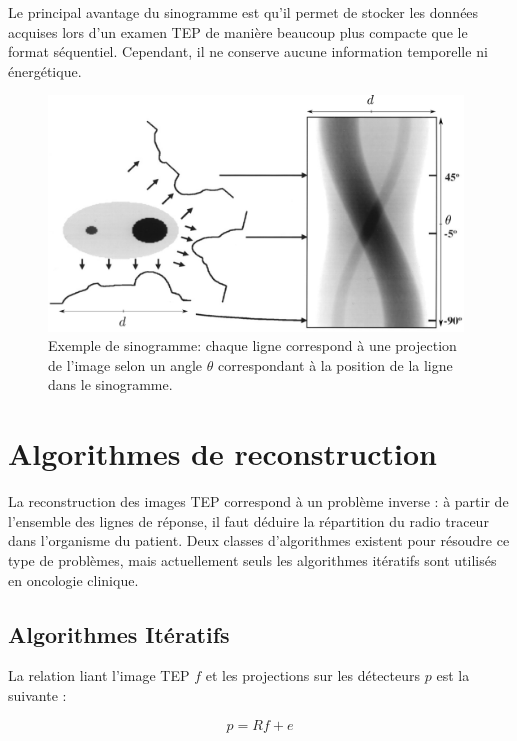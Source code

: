 Le principal avantage du sinogramme est qu'il permet de stocker les données acquises lors d'un examen TEP de manière beaucoup plus compacte que le format séquentiel. Cependant, il ne conserve aucune information temporelle ni énergétique.

\begin{figure}
\centering
\includegraphics[width=11cm]{images/sino}
\caption[Principe du sinogramme]{Exemple de sinogramme: chaque ligne correspond à une projection de l'image selon un angle $\theta$ correspondant à la position de la ligne dans le sinogramme.}
\label{fig:sino}
\end{figure}











\chapter{Algorithmes de reconstruction}

La reconstruction des images TEP correspond à un problème inverse : à partir de l'ensemble des lignes de réponse, il faut déduire la répartition du radio traceur dans l'organisme du patient. Deux classes d'algorithmes existent pour résoudre ce type de problèmes, mais actuellement seuls les algorithmes itératifs sont utilisés en oncologie clinique. 

	\section{Algorithmes Itératifs}

La relation liant l'image TEP $f$ et les projections sur les détecteurs $p$ est la suivante :

\begin{equation}
	p = R f + e
\label{eq:eqTEP}
\end{equation}

